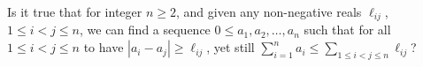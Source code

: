 Is it true that for integer $n\ge 2$, and given any non-negative reals $\ell_{ij}$, $1\le i<j\le n$, we can find a sequence $0\le a_1,a_2,\ldots,a_n$ such that for all $1\le i<j\le n$ to have $|a_i-a_j|\ge \ell_{ij}$, yet still $\sum_{i=1}^n a_i\le \sum_{1\le i<j\le n}\ell_{ij}$?
